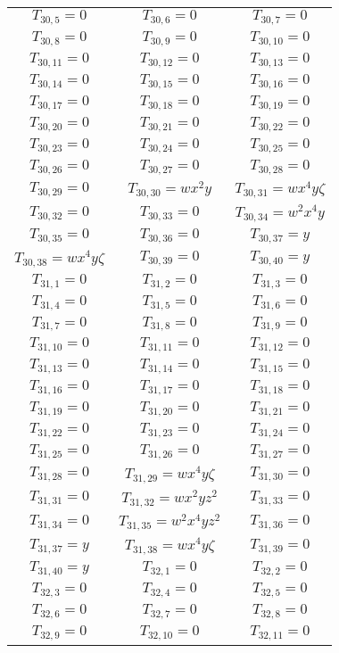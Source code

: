 \documentclass[12pt]{memoireuqam1.3}
\begin{document}
\begin{longtable}{|c|c|c|}
$T_{30,5}= 0$&
$T_{30,6}= 0$&
$T_{30,7}= 0$\\
$T_{30,8}= 0$&
$T_{30,9}= 0$&
$T_{30,10}= 0$\\
$T_{30,11}= 0$&
$T_{30,12}= 0$&
$T_{30,13}= 0$\\
$T_{30,14}= 0$&
$T_{30,15}= 0$&
$T_{30,16}= 0$\\
$T_{30,17}= 0$&
$T_{30,18}= 0$&
$T_{30,19}= 0$\\
$T_{30,20}= 0$&
$T_{30,21}= 0$&
$T_{30,22}= 0$\\
$T_{30,23}= 0$&
$T_{30,24}= 0$&
$T_{30,25}= 0$\\
$T_{30,26}= 0$&
$T_{30,27}= 0$&
$T_{30,28}= 0$\\
$T_{30,29}= 0$&
$T_{30,30}= wx^2y$&
$T_{30,31}= wx^4y\zeta$\\
$T_{30,32}= 0$&
$T_{30,33}= 0$&
$T_{30,34}= w^2x^4y$\\
$T_{30,35}= 0$&
$T_{30,36}= 0$&
$T_{30,37}= y$\\
$T_{30,38}= wx^4y\zeta$&
$T_{30,39}= 0$&
$T_{30,40}= y$\\
$T_{31,1}= 0$&
$T_{31,2}= 0$&
$T_{31,3}= 0$\\
$T_{31,4}= 0$&
$T_{31,5}= 0$&
$T_{31,6}= 0$\\
$T_{31,7}= 0$&
$T_{31,8}= 0$&
$T_{31,9}= 0$\\
$T_{31,10}= 0$&
$T_{31,11}= 0$&
$T_{31,12}= 0$\\
$T_{31,13}= 0$&
$T_{31,14}= 0$&
$T_{31,15}= 0$\\
$T_{31,16}= 0$&
$T_{31,17}= 0$&
$T_{31,18}= 0$\\
$T_{31,19}= 0$&
$T_{31,20}= 0$&
$T_{31,21}= 0$\\
$T_{31,22}= 0$&
$T_{31,23}= 0$&
$T_{31,24}= 0$\\
$T_{31,25}= 0$&
$T_{31,26}= 0$&
$T_{31,27}= 0$\\
$T_{31,28}= 0$&
$T_{31,29}= wx^4y\zeta$&
$T_{31,30}= 0$\\
$T_{31,31}= 0$&
$T_{31,32}= wx^2yz^2$&
$T_{31,33}= 0$\\
$T_{31,34}= 0$&
$T_{31,35}= w^2x^4yz^2$&
$T_{31,36}= 0$\\
$T_{31,37}= y$&
$T_{31,38}= wx^4y\zeta$&
$T_{31,39}= 0$\\
$T_{31,40}= y$&
$T_{32,1}= 0$&
$T_{32,2}= 0$\\
$T_{32,3}= 0$&
$T_{32,4}= 0$&
$T_{32,5}= 0$\\
$T_{32,6}= 0$&
$T_{32,7}= 0$&
$T_{32,8}= 0$\\
$T_{32,9}= 0$&
$T_{32,10}= 0$&
$T_{32,11}= 0$\\

\end{longtable}
\end{document}
